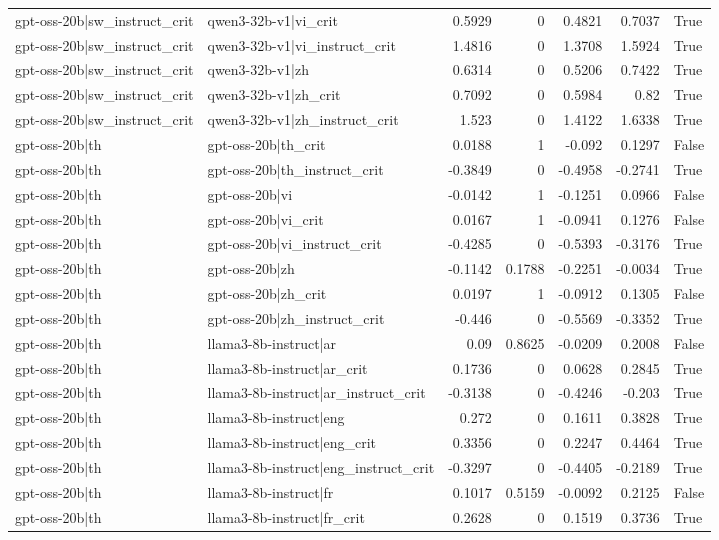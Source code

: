 \begin{table}
\begin{tabular}{l l r r r r l}
gpt-oss-20b|sw_instruct_crit & qwen3-32b-v1|vi_crit & 0.5929 & 0 & 0.4821 & 0.7037 & True \\
gpt-oss-20b|sw_instruct_crit & qwen3-32b-v1|vi_instruct_crit & 1.4816 & 0 & 1.3708 & 1.5924 & True \\
gpt-oss-20b|sw_instruct_crit & qwen3-32b-v1|zh & 0.6314 & 0 & 0.5206 & 0.7422 & True \\
gpt-oss-20b|sw_instruct_crit & qwen3-32b-v1|zh_crit & 0.7092 & 0 & 0.5984 & 0.82 & True \\
gpt-oss-20b|sw_instruct_crit & qwen3-32b-v1|zh_instruct_crit & 1.523 & 0 & 1.4122 & 1.6338 & True \\
gpt-oss-20b|th & gpt-oss-20b|th_crit & 0.0188 & 1 & -0.092 & 0.1297 & False \\
gpt-oss-20b|th & gpt-oss-20b|th_instruct_crit & -0.3849 & 0 & -0.4958 & -0.2741 & True \\
gpt-oss-20b|th & gpt-oss-20b|vi & -0.0142 & 1 & -0.1251 & 0.0966 & False \\
gpt-oss-20b|th & gpt-oss-20b|vi_crit & 0.0167 & 1 & -0.0941 & 0.1276 & False \\
gpt-oss-20b|th & gpt-oss-20b|vi_instruct_crit & -0.4285 & 0 & -0.5393 & -0.3176 & True \\
gpt-oss-20b|th & gpt-oss-20b|zh & -0.1142 & 0.1788 & -0.2251 & -0.0034 & True \\
gpt-oss-20b|th & gpt-oss-20b|zh_crit & 0.0197 & 1 & -0.0912 & 0.1305 & False \\
gpt-oss-20b|th & gpt-oss-20b|zh_instruct_crit & -0.446 & 0 & -0.5569 & -0.3352 & True \\
gpt-oss-20b|th & llama3-8b-instruct|ar & 0.09 & 0.8625 & -0.0209 & 0.2008 & False \\
gpt-oss-20b|th & llama3-8b-instruct|ar_crit & 0.1736 & 0 & 0.0628 & 0.2845 & True \\
gpt-oss-20b|th & llama3-8b-instruct|ar_instruct_crit & -0.3138 & 0 & -0.4246 & -0.203 & True \\
gpt-oss-20b|th & llama3-8b-instruct|eng & 0.272 & 0 & 0.1611 & 0.3828 & True \\
gpt-oss-20b|th & llama3-8b-instruct|eng_crit & 0.3356 & 0 & 0.2247 & 0.4464 & True \\
gpt-oss-20b|th & llama3-8b-instruct|eng_instruct_crit & -0.3297 & 0 & -0.4405 & -0.2189 & True \\
gpt-oss-20b|th & llama3-8b-instruct|fr & 0.1017 & 0.5159 & -0.0092 & 0.2125 & False \\
gpt-oss-20b|th & llama3-8b-instruct|fr_crit & 0.2628 & 0 & 0.1519 & 0.3736 & True \\

\end{tabular}
\end{table}
